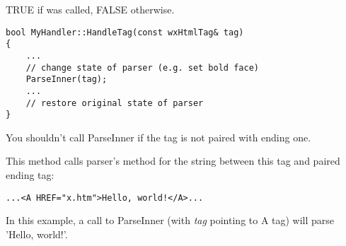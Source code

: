 
TRUE if  was called,
FALSE otherwise.


\begin{verbatim}
bool MyHandler::HandleTag(const wxHtmlTag& tag)
{
    ...
    // change state of parser (e.g. set bold face)
    ParseInner(tag);
    ...
    // restore original state of parser
}
\end{verbatim}

You shouldn't call ParseInner if the tag is not paired with ending one.

\label{wxhtmltaghandlerparseinner}


This method calls parser's  method
for the string between this tag and paired ending tag:

\begin{verbatim}
...<A HREF="x.htm">Hello, world!</A>...
\end{verbatim}

In this example, a call to ParseInner (with {\it tag} pointing to A tag)
will parse 'Hello, world!'.

